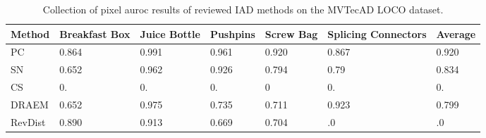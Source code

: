 \begin{table}[htbp]
    \tiny
    \centering
    \begin{tabularx}{\textwidth}{|X|X|X|X|X|X|X|}%
        \hline
        \textbf{Method} & \textbf{Breakfast Box} & \textbf{Juice Bottle} & \textbf{Pushpins} & \textbf{Screw Bag} & \textbf{Splicing Connectors} & \textbf{Average} \\
        \hline
        PC \cite{patchCore2022} & 0.864 & 0.991 & 0.961 & 0.920 & 0.867 & 0.920 \\
        \hline 
        SN \cite{liu2023simplenet} & 0.652 & 0.962 & 0.926 & 0.794 & 0.79 & 0.834 \\
        \hline %
        CS \cite{csflow2022} & 0. & 0. & 0. & 0 & 0. & 0. \\
        \hline
        DRAEM \cite{Zavrtanik_2021DRAEM} & 0.652 & 0.975 & 0.735 & 0.711 & 0.923 & 0.799 \\
        \hline
        RevDist \cite{revdist2023} & 0.890 & 0.913 & 0.669 & 0.704 & .0 & .0 \\
        \hline
    \end{tabularx}
    \caption{Collection of pixel auroc results of reviewed IAD methods on the MVTecAD LOCO \cite{LOCODentsAndScratchesBergmann2022} dataset.}
    \label{tab:pixelaurocloco}
\end{table}





